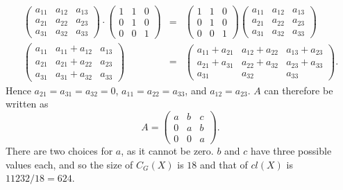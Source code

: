 \documentclass[11pt]{article} \usepackage{amssymb}
\begin{document}
\begin{enumerate}
\begin{enumerate}
\begin{itemize}
        \begin{eqnarray*}
          \begin{pmatrix}
            a_{11}&a_{12}  &a_{13} \\ 
            a_{21}&a_{22}  &a_{23} \\ 
            a_{31}&a_{32}  &a_{33} 
          \end{pmatrix}
          \cdot
          \begin{pmatrix}
            1&1  &0 \\ 
            0&1  &0 \\ 
            0&0  &1 
          \end{pmatrix}
          &=&
          \begin{pmatrix}
            1&1  &0 \\ 
            0&1  &0 \\ 
            0&0  &1 
          \end{pmatrix}
          \begin{pmatrix}
            a_{11}&a_{12}  &a_{13} \\ 
            a_{21}&a_{22}  &a_{23} \\ 
            a_{31}&a_{32}  &a_{33} 
          \end{pmatrix}
          \\
          \begin{pmatrix}
            a_{11}&a_{11}+a_{12}  &a_{13} \\ 
            a_{21}&a_{21}+a_{22}  &a_{23} \\ 
            a_{31}&a_{31}+a_{32}  &a_{33} 
          \end{pmatrix}
          &=&
          \begin{pmatrix}
            a_{11}+a_{21}&a_{12}+a_{22}  &a_{13}+a_{23} \\ 
            a_{21}+a_{31}&a_{22}+a_{32}  &a_{23}+a_{33} \\ 
            a_{31}&a_{32}  &a_{33} 
          \end{pmatrix}.
        \end{eqnarray*}
        Hence $a_{21}=a_{31}=a_{32}=0$, $a_{11}=a_{22}=a_{33}$, and $a_{12}=a_{23}$. 
        $A$ can therefore be written as
        \begin{equation*}
          A=
          \begin{pmatrix}
            a &b  &c \\ 
            0 &a  &b \\ 
            0 &0  &a 
          \end{pmatrix}.
        \end{equation*}
        There are two choices for $a$, as it cannot be zero. $b$ and $c$ have
        three possible values each, and so the size of $C_G(X)$ is $18$
        and that of $cl(X)$ is $11232/18=624$.


\end{itemize}
\end{enumerate}
\end{enumerate}
\end{document}

